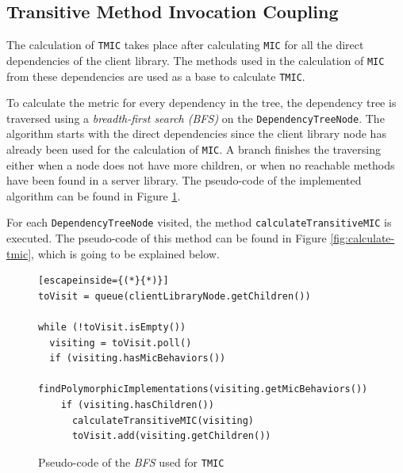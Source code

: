 \subsection{Transitive Method Invocation Coupling}\label{subsec:tmic}
The calculation of \texttt{TMIC} takes place after calculating \texttt{MIC} for all the direct dependencies of the client library. The methods used in the calculation of \texttt{MIC} from these dependencies are used as a base to calculate \texttt{TMIC}.

To calculate the metric for every dependency in the tree, the dependency tree is traversed using a \textit{breadth-first search (BFS)} on the \texttt{DependencyTreeNode}. The algorithm starts with the direct dependencies since the client library node has already been used for the calculation of \texttt{MIC}. A branch finishes the traversing either when a node does not have more children, or when no reachable methods have been found in a server library. The pseudo-code of the implemented algorithm can be found in Figure \ref{fig:tree-traversing-tmic}.

For each \texttt{DependencyTreeNode} visited, the method \texttt{calculateTransitiveMIC} is executed. The pseudo-code of this method can be found in Figure \ref{fig:calculate-tmic}, which is going to be explained below.

\begin{figure}[ht!]
\begin{lstlisting}[escapeinside={(*}{*)}]
toVisit = queue(clientLibraryNode.getChildren())

while (!toVisit.isEmpty())
  visiting = toVisit.poll()
  if (visiting.hasMicBehaviors())
    findPolymorphicImplementations(visiting.getMicBehaviors())
    if (visiting.hasChildren())
      calculateTransitiveMIC(visiting)
      toVisit.add(visiting.getChildren())
\end{lstlisting}
\caption{Pseudo-code of the \textit{BFS} used for \texttt{TMIC}}
\label{fig:tree-traversing-tmic}
\end{figure}

